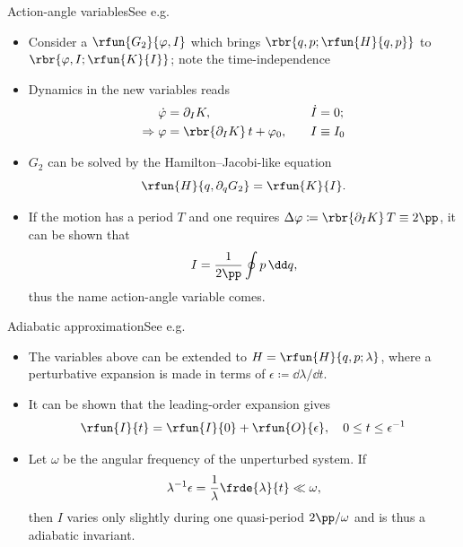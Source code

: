 \documentclass{beamer}
\begin{document}
\begin{frame}{Action-angle variables}{See e.g.\ \cite{Henrard_1993}}
\begin{itemize}
\item Consider a $\rfun{G_2}{\varphi, I}$ which brings $\rbr{q, p; \rfun{H}{q, 
p}}$ to $\rbr{\varphi, I; \rfun{K}{I}}$; note the time-independence
\item Dynamics in the new variables reads
\begin{alignat}{3}
\dot \varphi &= \partial_I K,&\quad \dot I &= 0; \\
\Rightarrow \varphi &= \rbr{\partial_I K}\,t+\varphi_0,&\quad I &\equiv I_0
\end{alignat}
\item $G_2$ can be solved by the Hamilton--Jacobi-like equation
\begin{equation}
\rfun{H}{q, \partial_q G_2} = \rfun{K}{I}.
\end{equation}
\item If the motion has a period $T$ and one requires $\Delta \varphi \coloneqq 
\rbr{\partial_I K}\,T \equiv 2\pp$, it can be shown that
\begin{equation}
I = \frac{1}{2\pp}\oint p\,\dd q,
\end{equation}
thus the name action-angle variable comes.

\end{itemize}
\end{frame}


\begin{frame}{Adiabatic approximation}{See e.g.\ \cite{Henrard_1993}}
\begin{itemize}
\item The variables above can be extended to $H = \rfun{H}{q, p; \lambda}$,
where a perturbative expansion is made in terms of $\epsilon \coloneqq \dd 
\lambda / \dd t$.
\item It can be shown that the leading-order expansion gives
\begin{equation}
\rfun{I}{t} = \rfun{I}{0} +  \rfun{O}{\epsilon},\quad 0 \le t \le 
\epsilon^{-1}
\end{equation}
\item Let $\omega$ be the angular frequency of the unperturbed system. If
\begin{equation}
\lambda^{-1} \epsilon = \frac{1}{\lambda}\frde{\lambda}{t} \ll \omega,
\label{eq:adiab-cond}
\end{equation}
then $I$ varies only slightly during one quasi-period $2\pp/\omega$ and is 
thus a \alert{adiabatic invariant}.

\end{itemize}

\end{frame}
\end{document}
